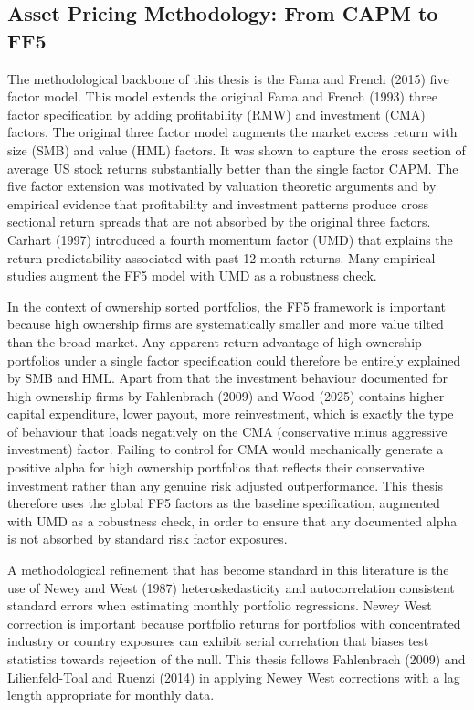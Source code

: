 \subsection{Asset Pricing Methodology: From CAPM to FF5}

The methodological backbone of this thesis is the Fama and French (2015) five factor model. This model extends the original Fama and French (1993) three factor specification by adding profitability (RMW) and investment (CMA) factors. The original three factor model augments the market excess return with size (SMB) and value (HML) factors. It was shown to capture the cross section of average US stock returns substantially better than the single factor CAPM. The five factor extension was motivated by valuation theoretic arguments and by empirical evidence that profitability and investment patterns produce cross sectional return spreads that are not absorbed by the original three factors. Carhart (1997) introduced a fourth momentum factor (UMD) that explains the return predictability associated with past 12 month returns. Many empirical studies augment the FF5 model with UMD as a robustness check.

In the context of ownership sorted portfolios, the FF5 framework is important because high ownership firms are systematically smaller and more value tilted than the broad market. Any apparent return advantage of high ownership portfolios under a single factor specification could therefore be entirely explained by SMB and HML. Apart from that the investment behaviour documented for high ownership firms by Fahlenbrach (2009) and Wood (2025) contains higher capital expenditure, lower payout, more reinvestment, which is exactly the type of behaviour that loads negatively on the CMA (conservative minus aggressive investment) factor. Failing to control for CMA would mechanically generate a positive alpha for high ownership portfolios that reflects their conservative investment rather than any genuine risk adjusted outperformance. This thesis therefore uses the global FF5 factors as the baseline specification, augmented with UMD as a robustness check, in order to ensure that any documented alpha is not absorbed by standard risk factor exposures.

A methodological refinement that has become standard in this literature is the use of Newey and West (1987) heteroskedasticity and autocorrelation consistent standard errors when estimating monthly portfolio regressions. Newey West correction is important because portfolio returns for portfolios with concentrated industry or country exposures can exhibit serial correlation that biases test statistics towards rejection of the null. This thesis follows Fahlenbrach (2009) and Lilienfeld-Toal and Ruenzi (2014) in applying Newey West corrections with a lag length appropriate for monthly data.



